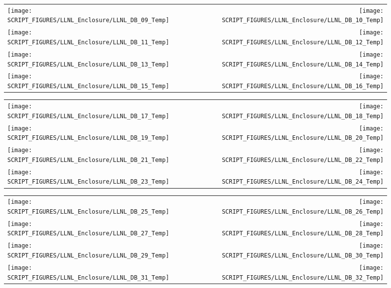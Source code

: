 \begin{figure}[p]
\begin{tabular*}{\textwidth}{l@{\extracolsep{\fill}}r}
\texttt{[image: SCRIPT\_FIGURES/LLNL\_Enclosure/LLNL\_DB\_09\_Temp]} &
\texttt{[image: SCRIPT\_FIGURES/LLNL\_Enclosure/LLNL\_DB\_10\_Temp]} \\
\texttt{[image: SCRIPT\_FIGURES/LLNL\_Enclosure/LLNL\_DB\_11\_Temp]} &
\texttt{[image: SCRIPT\_FIGURES/LLNL\_Enclosure/LLNL\_DB\_12\_Temp]} \\
\texttt{[image: SCRIPT\_FIGURES/LLNL\_Enclosure/LLNL\_DB\_13\_Temp]} &
\texttt{[image: SCRIPT\_FIGURES/LLNL\_Enclosure/LLNL\_DB\_14\_Temp]} \\
\texttt{[image: SCRIPT\_FIGURES/LLNL\_Enclosure/LLNL\_DB\_15\_Temp]} &
\texttt{[image: SCRIPT\_FIGURES/LLNL\_Enclosure/LLNL\_DB\_16\_Temp]}
\end{tabular*}
\end{figure}

\begin{figure}[p]
\begin{tabular*}{\textwidth}{l@{\extracolsep{\fill}}r}
\texttt{[image: SCRIPT\_FIGURES/LLNL\_Enclosure/LLNL\_DB\_17\_Temp]} &
\texttt{[image: SCRIPT\_FIGURES/LLNL\_Enclosure/LLNL\_DB\_18\_Temp]} \\
\texttt{[image: SCRIPT\_FIGURES/LLNL\_Enclosure/LLNL\_DB\_19\_Temp]} &
\texttt{[image: SCRIPT\_FIGURES/LLNL\_Enclosure/LLNL\_DB\_20\_Temp]} \\
\texttt{[image: SCRIPT\_FIGURES/LLNL\_Enclosure/LLNL\_DB\_21\_Temp]} &
\texttt{[image: SCRIPT\_FIGURES/LLNL\_Enclosure/LLNL\_DB\_22\_Temp]} \\
\texttt{[image: SCRIPT\_FIGURES/LLNL\_Enclosure/LLNL\_DB\_23\_Temp]} &
\texttt{[image: SCRIPT\_FIGURES/LLNL\_Enclosure/LLNL\_DB\_24\_Temp]}
\end{tabular*}
\end{figure}

\begin{figure}[p]
\begin{tabular*}{\textwidth}{l@{\extracolsep{\fill}}r}
\texttt{[image: SCRIPT\_FIGURES/LLNL\_Enclosure/LLNL\_DB\_25\_Temp]} &
\texttt{[image: SCRIPT\_FIGURES/LLNL\_Enclosure/LLNL\_DB\_26\_Temp]} \\
\texttt{[image: SCRIPT\_FIGURES/LLNL\_Enclosure/LLNL\_DB\_27\_Temp]} &
\texttt{[image: SCRIPT\_FIGURES/LLNL\_Enclosure/LLNL\_DB\_28\_Temp]} \\
\texttt{[image: SCRIPT\_FIGURES/LLNL\_Enclosure/LLNL\_DB\_29\_Temp]} &
\texttt{[image: SCRIPT\_FIGURES/LLNL\_Enclosure/LLNL\_DB\_30\_Temp]} \\
\texttt{[image: SCRIPT\_FIGURES/LLNL\_Enclosure/LLNL\_DB\_31\_Temp]} &
\texttt{[image: SCRIPT\_FIGURES/LLNL\_Enclosure/LLNL\_DB\_32\_Temp]}
\end{tabular*}
\end{figure}

